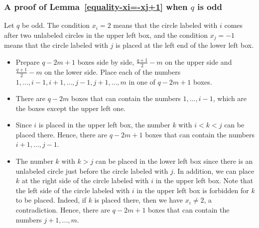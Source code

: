 \documentclass{article}
\theoremstyle{plain}
\theoremstyle{definition}
\theoremstyle{remark}
\numberwithin{equation}{section}
\begin{document}
\subsubsection{A proof of Lemma~\ref{equality-xi=-xj+1} when $q$ is odd}
Let $q$ be odd.
The condition $x_i=2$ means that the circle labeled with $i$ comes after two unlabeled circles in the upper left box, 
and the condition $x_j=-1$ means that the circle labeled with $j$ is placed at the left end of the lower left box. 
\begin{itemize}
\item Prepare $q-2m+1$ boxes side by side, $\displaystyle \frac{q+1}{2}-m$ on the upper side and $\displaystyle \frac{q+1}{2}-m$ on the lower side. Place each of the numbers $1,\dots, i-1, i+1, \dots, j-1, j+1,\ldots,m$ in one of $q-2m+1$ boxes. 

%
%
\item There are $q-2m$ boxes that can contain the numbers $1,\ldots,i-1$, which are the boxes except the upper left one. 
\item Since $i$ is placed in the upper left box, the number $k$ with $i<k<j$ can be placed there. 
Hence, there are $q-2m+1$ boxes that can contain the numbers $i+1,\ldots,j-1$. 
\item The number $k$ with $k>j$ can be placed in the lower left box since there is an unlabeled circle just before the circle labeled with $j$. 
In addition, we can place $k$ at the right side of the circle labeled with $i$ in the upper left box. 
Note that the left side of the circle labeled with $i$ in the upper left box is forbidden for $k$ to be placed. 
Indeed, if $k$ is placed there, then we have $x_i \neq 2$, a contradiction. 
Hence, there are $q-2m+1$ boxes that can contain the numbers $j+1,\ldots,m$. 
\end{itemize}
\end{document}
